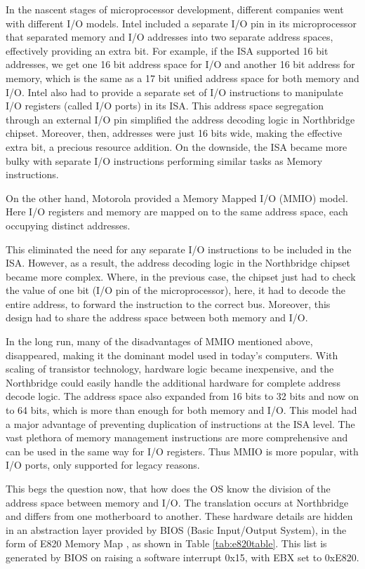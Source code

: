 In the nascent stages of microprocessor development, different companies went with different I/O models. Intel included a separate I/O pin in its microprocessor that separated memory and I/O addresses into two separate address spaces, effectively providing an extra bit. For example, if the ISA supported 16 bit addresses, we get one 16 bit address space for I/O and another 16 bit address for memory, which is the same as a 17 bit unified address space for both memory and I/O. Intel also had to provide a separate set of I/O instructions to manipulate I/O registers (called I/O ports) in its ISA. This address space segregation through an external I/O pin simplified the address decoding logic in Northbridge chipset. Moreover, then, addresses were just 16 bits wide, making the effective extra bit, a precious resource addition. On the downside, the ISA became more bulky with separate I/O instructions performing similar tasks as Memory instructions.

On the other hand, Motorola provided a Memory Mapped I/O (MMIO) model. Here I/O registers and memory are mapped on to the same address space, each occupying distinct addresses.

This eliminated the need for any separate I/O instructions to be included in the ISA. However, as a result, the address decoding logic in the Northbridge chipset became more complex. Where, in the previous case, the chipset just had to check the value of one bit (I/O pin of the microprocessor), here, it had to decode the entire address, to forward the instruction to the correct bus. Moreover, this design had to share the address space between both memory and I/O.

In the long run, many of the disadvantages of MMIO mentioned above, disappeared, making it the dominant model used in today's computers. With scaling of transistor technology, hardware logic became inexpensive, and the Northbridge could easily handle the additional hardware for complete address decode logic. The address space also expanded from 16 bits to 32 bits and now on to 64 bits, which is more than enough for both memory and I/O. This model had a major advantage of preventing duplication of instructions at the ISA level. The vast plethora of memory management instructions are more comprehensive and can be used in the same way for I/O registers. Thus MMIO is more popular, with I/O ports, only supported for legacy reasons. 

This begs the question now, that how does the OS know the division of the address space between memory and I/O. The translation occurs at Northbridge and differs from one motherboard to another. These hardware details are hidden in an abstraction layer provided by BIOS (Basic Input/Output System), in the form of E820 Memory Map \cite{acpi_manual}, as shown in Table \ref{tab:e820table}. This list is generated by BIOS on raising a software interrupt 0x15, with EBX set to 0xE820. 

